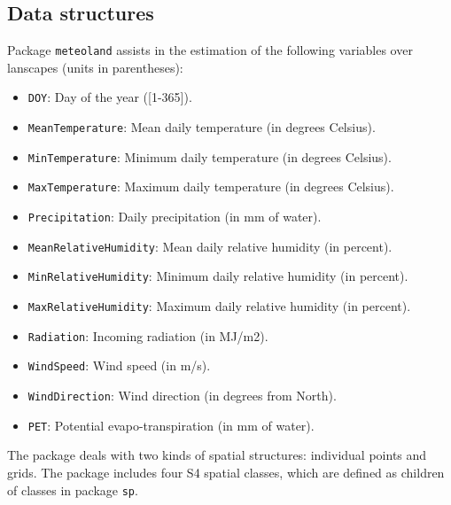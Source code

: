 \documentclass[11pt,a4paper]{article}
\begin{document}
\subsection{Data structures}
Package \texttt{meteoland} assists in the estimation of the following variables over lanscapes (units in parentheses):
\begin{itemize}
\item{\texttt{DOY}: Day of the year ([1-365]).}
\item{\texttt{MeanTemperature}: Mean daily temperature (in degrees Celsius).}
\item{\texttt{MinTemperature}: Minimum daily temperature (in degrees Celsius).}
\item{\texttt{MaxTemperature}: Maximum daily temperature (in degrees Celsius).}
\item{\texttt{Precipitation}: Daily precipitation (in mm of water).}
\item{\texttt{MeanRelativeHumidity}: Mean daily relative humidity (in percent).}
\item{\texttt{MinRelativeHumidity}: Minimum daily relative humidity (in percent).}
\item{\texttt{MaxRelativeHumidity}: Maximum daily relative humidity (in percent).}
\item{\texttt{Radiation}: Incoming radiation (in MJ/m2).}
\item{\texttt{WindSpeed}: Wind speed (in m/s).}
\item{\texttt{WindDirection}: Wind direction (in degrees from North).}
\item{\texttt{PET}: Potential evapo-transpiration (in mm of water).}
\end{itemize}

The package deals with two kinds of spatial structures: individual points and grids. The package includes four S4 spatial classes, which are defined as children of classes in package \texttt{sp}. 
\end{document}
